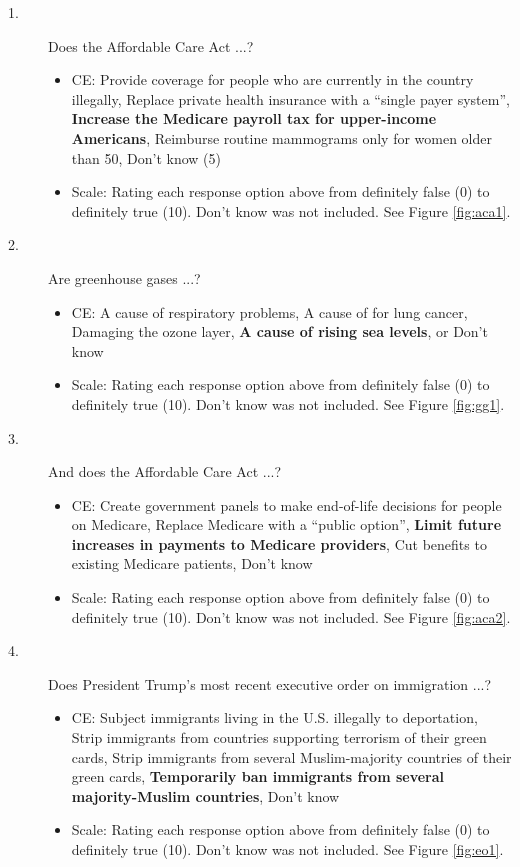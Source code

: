 \begin{description}
	\item[1.] Does the Affordable Care Act ...?
	\begin{itemize}
		\item  CE: Provide coverage for people who are currently in the country illegally, Replace private health insurance with a ``single payer system'', \textbf{Increase the Medicare payroll tax for upper-income Americans}, Reimburse routine mammograms only for women older than 50, Don’t know (5)
		\item  Scale: Rating each response option above from definitely false (0) to definitely true (10). Don’t know was not included. See Figure \ref{fig:aca1}.
	\end{itemize}
	\item[2.] Are greenhouse gases ...?
	\begin{itemize}
		\item CE: A cause of respiratory problems, A cause of for lung cancer, Damaging the ozone layer, \textbf{A cause of rising sea levels}, or Don’t know
		\item Scale: Rating each response option above from definitely false (0) to definitely true (10). Don’t know was not included. See Figure \ref{fig:gg1}.
	\end{itemize}
	\item[3.] And does the Affordable Care Act ...?
	\begin{itemize}
		\item CE: Create government panels to make end-of-life decisions for people on Medicare, Replace Medicare with a ``public option'', \textbf{Limit future increases in payments to Medicare providers}, Cut benefits to existing Medicare patients, Don’t know
		\item Scale: Rating each response option above from definitely false (0) to definitely true (10). Don’t know was not included. See Figure \ref{fig:aca2}.
	\end{itemize}
	\item[4.] Does President Trump’s most recent executive order on immigration ...?
	\begin{itemize}
		\item  CE: Subject immigrants living in the U.S. illegally to deportation, Strip immigrants from countries supporting terrorism of their green cards, Strip immigrants from several Muslim-majority countries of their green cards, \textbf{Temporarily ban immigrants from several majority-Muslim countries}, Don’t know
		\item  Scale: Rating each response option above from definitely false (0) to definitely true (10). Don’t know was not included. See Figure \ref{fig:eo1}.
	\end{itemize}
\end{description}

